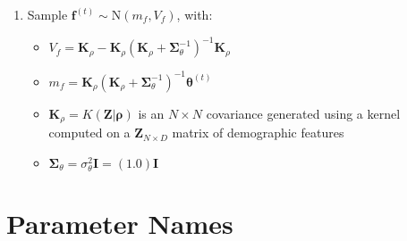 \documentclass[12pt,letterpaper]{article}
\begin{document}
\begin{enumerate}[(1)]
\begin{itemize}
    \end{itemize}
    \item Sample $\textbf{f}^{(t)} \sim \text{N}(m_f, V_f)$, with:
    \begin{itemize}
        \item $V_f = \textbf{K}_{\rho} - \textbf{K}_{\rho}(\textbf{K}_{\rho} + \boldsymbol{\Sigma}_{\theta}^{-1})^{-1}\textbf{K}_{\rho}$
        \item $m_f = \textbf{K}_{\rho}(\textbf{K}_{\rho} + \boldsymbol{\Sigma}_{\theta}^{-1})^{-1}\boldsymbol{\theta}^{(t)}$
        \item $\textbf{K}_{\rho} = K(\textbf{Z}|\boldsymbol{\rho})$ is an $N \times N$ covariance generated using a kernel computed on a $\textbf{Z}_{N \times D}$ matrix of demographic features
        \item $\boldsymbol{\Sigma}_{\theta} = \sigma_{\theta}^{2}\textbf{I} = (1.0) \textbf{I}$
    \end{itemize}
\end{enumerate}

\section{Parameter Names}
\end{document}
